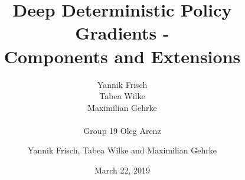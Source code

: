 \documentclass[accentcolor=tud1d,colorbacktitle,inverttitle,landscape,german,presentation,t]{tudbeamer}
\begin{document}
	
	\title[DDPG]{Deep Deterministic Policy Gradients -\\ Components and Extensions}
	\subtitle{Yannik Frisch\\Tabea Wilke\\Maximilian Gehrke \\\\Group 19 Oleg Arenz}
	
	\author[Yannik Frisch et al.]{Yannik Frisch, Tabea Wilke and Maximilian Gehrke}


	
	\date{March 22, 2019}
	

\begin{titleframe}
\end{titleframe}
\end{document}
